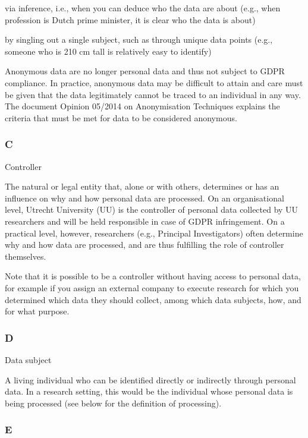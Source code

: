 \documentclass[
]{book}
\begin{document}
via inference, i.e., when you can deduce who the data are about (e.g., when profession is Dutch prime minister, it is clear who the data is about)

by singling out a single subject, such as through unique data points (e.g., someone who is 210 cm tall is relatively easy to identify)

Anonymous data are no longer personal data and thus not subject to GDPR compliance. In practice, anonymous data may be difficult
to attain and care must be given that the data legitimately cannot be traced to an individual in any way. The document
Opinion 05/2014 on Anonymisation Techniques
explains the criteria that must be met for data to be considered anonymous.

\hypertarget{c}{%
\subsubsection{C}\label{c}}

Controller

The natural or legal entity that, alone or with others, determines or has an influence on why and how
personal data are processed. On an organisational level, Utrecht University (UU) is the controller of personal data
collected by UU researchers and will be held responsible in case of GDPR infringement. On a practical level, however,
researchers (e.g., Principal Investigators) often determine why and how data are processed, and are thus fulfilling the
role of controller themselves.

Note that it is possible to be a controller without having access to personal
data, for example if you assign an external company to execute research for
which you determined which data they should collect, among which data subjects,
how, and for what purpose.

\hypertarget{d}{%
\subsubsection{D}\label{d}}

Data subject

A living individual who can be identified directly or indirectly through personal data. In a research setting,
this would be the individual whose personal data is being processed (see below for the definition of processing).

\hypertarget{e}{%
\subsubsection{E}\label{e}}
\end{document}
